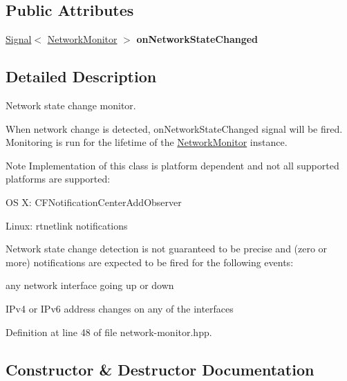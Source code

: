 \subsection*{Public Attributes}
\begin{DoxyCompactItemize}
\item 
\hyperlink{classndn_1_1util_1_1signal_1_1Signal}{Signal}$<$ \hyperlink{classndn_1_1util_1_1NetworkMonitor}{Network\+Monitor} $>$ {\bfseries on\+Network\+State\+Changed}\hypertarget{classndn_1_1util_1_1NetworkMonitor_a761d860b535d7b075afff99b6a486e24}{}\label{classndn_1_1util_1_1NetworkMonitor_a761d860b535d7b075afff99b6a486e24}

\end{DoxyCompactItemize}


\subsection{Detailed Description}
Network state change monitor. 

When network change is detected, on\+Network\+State\+Changed signal will be fired. Monitoring is run for the lifetime of the \hyperlink{classndn_1_1util_1_1NetworkMonitor}{Network\+Monitor} instance.

\begin{DoxyNote}{Note}
Implementation of this class is platform dependent and not all supported platforms are supported\+:
\begin{DoxyItemize}
\item OS X\+: C\+F\+Notification\+Center\+Add\+Observer
\item Linux\+: rtnetlink notifications
\end{DoxyItemize}
\end{DoxyNote}
Network state change detection is not guaranteed to be precise and (zero or more) notifications are expected to be fired for the following events\+:
\begin{DoxyItemize}
\item any network interface going up or down
\item I\+Pv4 or I\+Pv6 address changes on any of the interfaces 
\end{DoxyItemize}

Definition at line 48 of file network-\/monitor.\+hpp.



\subsection{Constructor \& Destructor Documentation}
